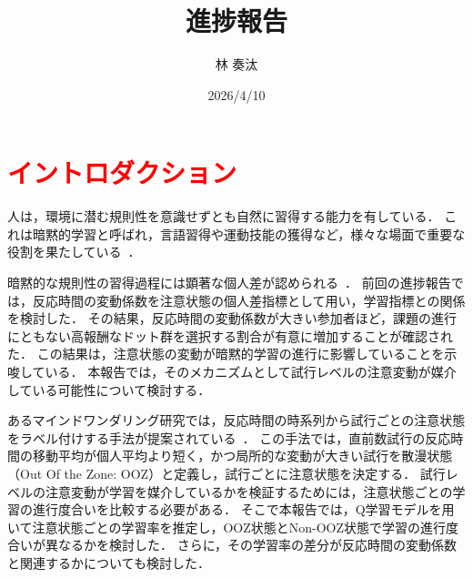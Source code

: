 \documentclass[dvipdfmx]{jsarticle}
\title{進捗報告}
\author{林 奏汰}
\date{2026/4/10}
\begin{document}
\maketitle



\section{\textcolor{red}{イントロダクション}}
人は，環境に潜む規則性を意識せずとも自然に習得する能力を有している．
これは暗黙的学習と呼ばれ，言語習得や運動技能の獲得など，様々な場面で重要な役割を果たしている~\cite{cleeremans1998implicit,frensch2003implicit,maresch2021measures,costea2023implicit}．

暗黙的な規則性の習得過程には顕著な個人差が認められる~\cite{kalra2019evidence}．
前回の進捗報告では，反応時間の変動係数を注意状態の個人差指標として用い，学習指標との関係を検討した．
その結果，反応時間の変動係数が大きい参加者ほど，課題の進行にともない高報酬なドット群を選択する割合が有意に増加することが確認された．
この結果は，注意状態の変動が暗黙的学習の進行に影響していることを示唆している．
本報告では，そのメカニズムとして試行レベルの注意変動が媒介している可能性について検討する．

あるマインドワンダリング研究では，反応時間の時系列から試行ごとの注意状態をラベル付けする手法が提案されている~\cite{decker2023pay}．
この手法では，直前数試行の反応時間の移動平均が個人平均より短く，かつ局所的な変動が大きい試行を散漫状態（Out Of the Zone: OOZ）と定義し，試行ごとに注意状態を決定する．
試行レベルの注意変動が学習を媒介しているかを検証するためには，注意状態ごとの学習の進行度合いを比較する必要がある．
そこで本報告では，Q学習モデルを用いて注意状態ごとの学習率を推定し，OOZ状態とNon-OOZ状態で学習の進行度合いが異なるかを検討した．
さらに，その学習率の差分が反応時間の変動係数と関連するかについても検討した．
\end{document}
